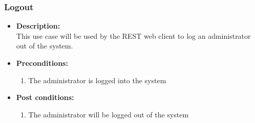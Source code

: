 \documentclass[a4paper,10pt]{article}
\begin{document}
\subsubsection{Logout}
\begin{itemize}
	\item \textbf {Description:}\\
	This use case will be used by the REST web client to log an administrator out of the system.
	\item \textbf {Preconditions:}
		\begin{enumerate}
			\item The administrator is logged into the system
		\end{enumerate}
	\item \textbf {Post conditions:}
		\begin{enumerate}
			\item The administrator will be logged out of the system
		\end{enumerate}
\end{itemize}
\end{document}
